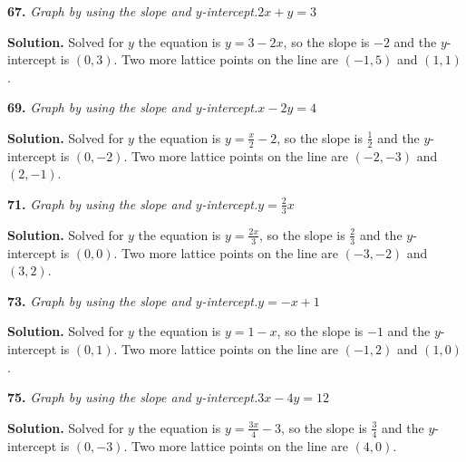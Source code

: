 \documentclass{ximera}
\begin{document}
\begin{problem}
\textbf{67.} \emph{Graph by using the slope and $y$-intercept.}\quad $2x + y = 3$          \figbox{\gridsm}

\begin{hint}
\textbf{Solution.} Solved for $y$ the equation is $y=3 - 2x$, so the slope is $-2$ and the $y$-intercept is $(0,3)$. Two more lattice points on the line are $(-1,5)$ and $(1,1)$.
\end{hint}
\end{problem}

\begin{problem}
\textbf{69.} \emph{Graph by using the slope and $y$-intercept.}\quad $x - 2y = 4$          \figbox{\gridsm}

\begin{hint}
\textbf{Solution.} Solved for $y$ the equation is $y=\frac{x}{2} - 2$, so the slope is $\frac{1}{2}$ and the $y$-intercept is $(0,-2)$. Two more lattice points on the line are $(-2,-3)$ and $(2,-1)$.
\end{hint}
\end{problem}

\begin{problem}
\textbf{71.} \emph{Graph by using the slope and $y$-intercept.}\quad $y = \frac{2}{3}x$    \figbox{\gridsm}

\begin{hint}
\textbf{Solution.} Solved for $y$ the equation is $y=\frac{2x}{3}$, so the slope is $\frac{2}{3}$ and the $y$-intercept is $(0,0)$. Two more lattice points on the line are $(-3,-2)$ and $(3,2)$.
\end{hint}
\end{problem}

\begin{problem}
\textbf{73.} \emph{Graph by using the slope and $y$-intercept.}\quad $y = -x + 1$          \figbox{\gridsm}

\begin{hint}
\textbf{Solution.} Solved for $y$ the equation is $y=1 - x$, so the slope is $-1$ and the $y$-intercept is $(0,1)$. Two more lattice points on the line are $(-1,2)$ and $(1,0)$.
\end{hint}
\end{problem}

\begin{problem}
\textbf{75.} \emph{Graph by using the slope and $y$-intercept.}\quad $3x - 4y = 12$        \figbox{\gridsm}

\begin{hint}
\textbf{Solution.} Solved for $y$ the equation is $y=\frac{3x}{4} - 3$, so the slope is $\frac{3}{4}$ and the $y$-intercept is $(0,-3)$. Two more lattice points on the line are $(4,0)$.
\end{hint}
\end{problem}
\end{document}
